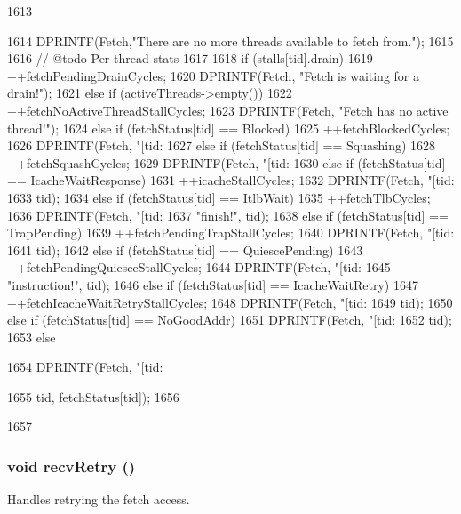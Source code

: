 \begin{DoxyCode}
1613                                              {
1614     DPRINTF(Fetch,"There are no more threads available to fetch from.\n");
1615 
1616     // @todo Per-thread stats
1617 
1618     if (stalls[tid].drain) {
1619         ++fetchPendingDrainCycles;
1620         DPRINTF(Fetch, "Fetch is waiting for a drain!\n");
1621     } else if (activeThreads->empty()) {
1622         ++fetchNoActiveThreadStallCycles;
1623         DPRINTF(Fetch, "Fetch has no active thread!\n");
1624     } else if (fetchStatus[tid] == Blocked) {
1625         ++fetchBlockedCycles;
1626         DPRINTF(Fetch, "[tid:%
1627     } else if (fetchStatus[tid] == Squashing) {
1628         ++fetchSquashCycles;
1629         DPRINTF(Fetch, "[tid:%
1630     } else if (fetchStatus[tid] == IcacheWaitResponse) {
1631         ++icacheStallCycles;
1632         DPRINTF(Fetch, "[tid:%
1633                 tid);
1634     } else if (fetchStatus[tid] == ItlbWait) {
1635         ++fetchTlbCycles;
1636         DPRINTF(Fetch, "[tid:%
1637                 "finish!\n", tid);
1638     } else if (fetchStatus[tid] == TrapPending) {
1639         ++fetchPendingTrapStallCycles;
1640         DPRINTF(Fetch, "[tid:%
1641                 tid);
1642     } else if (fetchStatus[tid] == QuiescePending) {
1643         ++fetchPendingQuiesceStallCycles;
1644         DPRINTF(Fetch, "[tid:%
1645                 "instruction!\n", tid);
1646     } else if (fetchStatus[tid] == IcacheWaitRetry) {
1647         ++fetchIcacheWaitRetryStallCycles;
1648         DPRINTF(Fetch, "[tid:%
1649                 tid);
1650     } else if (fetchStatus[tid] == NoGoodAddr) {
1651             DPRINTF(Fetch, "[tid:%
1652                     tid);
1653     } else {
1654         DPRINTF(Fetch, "[tid:%
      
1655              tid, fetchStatus[tid]);
1656     }
1657 }
\end{DoxyCode}
\hypertarget{classDefaultFetch_a29cb5a4f98063ce6e9210eacbdb35298}{
\subsubsection[{recvRetry}]{\setlength{\rightskip}{0pt plus 5cm}void recvRetry ()}}
\label{classDefaultFetch_a29cb5a4f98063ce6e9210eacbdb35298}
Handles retrying the fetch access. 


